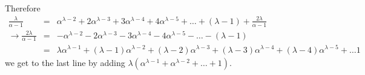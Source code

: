 \documentclass[aps,preprint,preprintnumbers,nofootinbib,showpacs,prd]{revtex4-1}
\newcommand{\nbea}{\begin{eqnarray*}}
\newcommand{\neea}{\end{eqnarray*}}
\begin{document}
Therefore
%
\nbea
\frac{\lambda}{\alpha - 1} & = & \alpha^{\lambda - 2} + 2\alpha^{\lambda - 3} + 3\alpha^{\lambda - 4} + 4\alpha^{\lambda - 5} + \dots + (\lambda - 1) + \frac{2\lambda}{\alpha - 1} \\
\to \frac{2\lambda}{\alpha - 1} & = & -\alpha^{\lambda - 2} - 2\alpha^{\lambda - 3} - 3\alpha^{\lambda - 4} - 4\alpha^{\lambda - 5} - \dots - (\lambda - 1) \\
& = & \lambda \alpha^{\lambda -1} + (\lambda - 1)\alpha^{\lambda - 2} + (\lambda - 2)\alpha^{\lambda - 3} + (\lambda - 3)\alpha^{\lambda - 4} + (\lambda - 4)\alpha^{\lambda - 5} + \dots 1
\neea
%
we get to the last line by adding $\lambda(\alpha^{\lambda - 1} + \alpha^{\lambda - 2} + \dots + 1)$.
\end{document}
